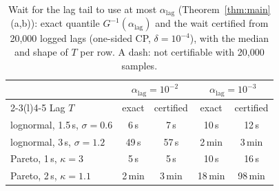 \begin{table}[!htbp]
\centering
\caption{Wait for the lag tail to use at most $\alpha_{\mathrm{lag}}$ (Theorem~\ref{thm:main}(a,b)): exact quantile $G^{-1}(\alpha_{\mathrm{lag}})$ and the wait certified from 20{,}000 logged lags (one-sided CP, $\delta{=}10^{-4}$), with the median and shape of $T$ per row. A dash: not certifiable with 20{,}000 samples.}
\label{tab:lag}
\footnotesize
\setlength{\tabcolsep}{3pt}
\begin{tabular}{@{}l cc cc@{}}
\toprule
 & \multicolumn{2}{c}{$\alpha_{\mathrm{lag}}{=}10^{-2}$} & \multicolumn{2}{c}{$\alpha_{\mathrm{lag}}{=}10^{-3}$} \\
\cmidrule(lr){2-3}\cmidrule(l){4-5}
Lag $T$ & exact & certified & exact & certified \\
\midrule
lognormal, 1.5\,s, $\sigma{=}0.6$ & 6\,s & 7\,s & 10\,s & 12\,s \\
lognormal, 3\,s, $\sigma{=}1.2$ & 49\,s & 57\,s & 2\,min & 3\,min \\
Pareto, 1\,s, $\kappa{=}3$ & 5\,s & 5\,s & 10\,s & 16\,s \\
Pareto, 2\,s, $\kappa{=}1.1$ & 2\,min & 3\,min & 18\,min & 98\,min \\
\bottomrule
\end{tabular}
\end{table}
